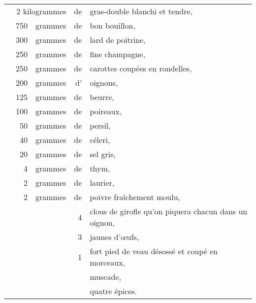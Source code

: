 \footnotesize
\begin{longtable}{rrrrp{18em}}
  & \multicolumn{2}{r}{2 kilogrammes} & de & gras-double blanchi et tendre,                               \\
  & 750 & grammes & de & bon bouillon,                                                                    \\
  & 300 & grammes & de & lard de poitrine,                                                                \\
  & 250 & grammes & de & fine champagne,                                                                  \\
  & 250 & grammes & de & carottes coupées en rondelles,                                                   \\
  & 200 & grammes & d' & oignons,                                                                         \\
  & 125 & grammes & de & beurre,                                                                          \\
  & 100 & grammes & de & poireaux,                                                                        \\
  &  50 & grammes & de & persil,                                                                          \\
  &  40 & grammes & de & céleri,                                                                          \\
  &  20 & grammes & de & sel gris,                                                                        \\
  &   4 & grammes & de & thym,                                                                            \\
  &   2 & grammes & de & laurier,                                                                         \\
  &   2 & grammes & de & poivre fraîchement moulu,                                                        \\
  &     &         &  4 & clous de girofle qu'on piquera chacun dans un oignon,                            \\
  &     &         &  3 & jaunes d'œufs,                                                                   \\
  &     &         &  1 & fort pied de veau désossé et coupé en morceaux,                                  \\
  &     &         &    & muscade,                                                                         \\
  &     &         &    & quatre épices.                                                                   \\
\end{longtable}
\normalsize

